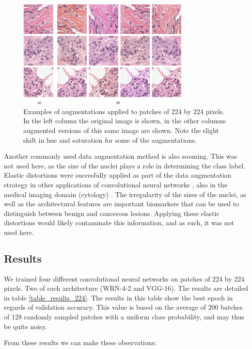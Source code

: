 \documentclass[journal]{IEEEtran}
\begin{document}
\begin{figure}[!t]
\centering{}
\includegraphics[width=3.4in]{augment_examples}
\caption{Examples of augmentations applied to patches of 224 by 224 pixels. In the left column the original image is shown, in the other columns augmented versions of this same image are shown. Note the slight shift in hue and saturation for some of the augmentations.}
\label{fig_augment}
\end{figure}


\medskip

Another commonly used data augmentation method is also zooming. This was not used here, as the size of the nuclei plays a role in determining the class label. Elastic distortions were succesfully applied as part of the data augmentation strategy in other applications of convolutional neural networks \cite{elastransforms}, also in the medical imaging domain (cytology) \cite{unet}. The irregularity of the sizes of the nuclei, as well as the architectural features are important biomarkers that can be used to distinguish between benign and cancerous lesions. Applying these elastic distortions would likely contaminate this information, and as such, it was not used here.

\subsection{Results}



We trained four different convolutional neural networks on patches of 224 by 224 pixels. Two of each architecture (WRN-4-2 and VGG-16). The results are detailed in table \ref{table_results_224}. The results in this table show the best epoch in regards of validation accuracy. This value is based on the average of 200 batches of 128 randomly sampled patches with a uniform class probability, and may thus be quite noisy. 

From these results we can make these observations:
\end{document}
